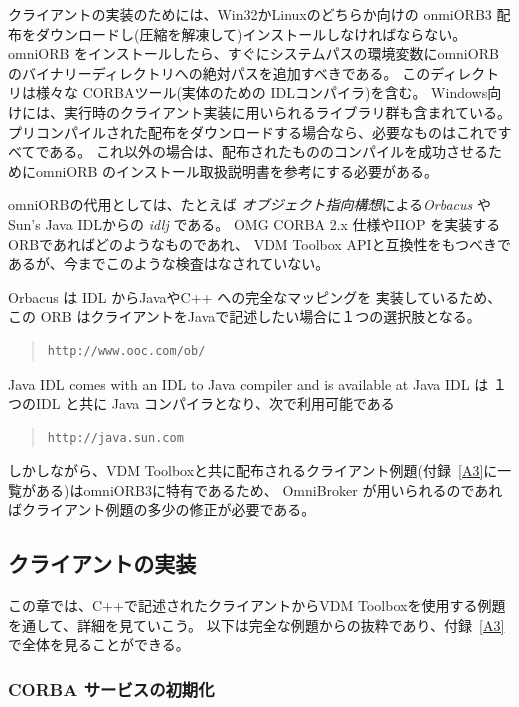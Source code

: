 \documentclass[\pformat,12pt]{jarticle}
\begin{document}
クライアントの実装のためには、Win32かLinuxのどちらか向けの onmiORB3 配布をダウンロードし(圧縮を解凍して)インストールしなければならない。
omniORB をインストールしたら、すぐにシステムパスの環境変数にomniORBのバイナリーディレクトリへの絶対パスを追加すべきである。
このディレクトリは様々な CORBAツール(実体のための IDLコンパイラ)を含む。
Windows向けには、実行時のクライアント実装に用いられるライブラリ群も含まれている。
プリコンパイルされた配布をダウンロードする場合なら、必要なものはこれですべてである。
これ以外の場合は、配布されたもののコンパイルを成功させるためにomniORB のインストール取扱説明書を参考にする必要がある。

omniORBの代用としては、たとえば {\em オブジェクト指向構想}による{\em Orbacus} や Sun's Java IDLからの {\em idlj} である。
 OMG CORBA 2.x 仕様やIIOP を実装するORBであればどのようなものであれ、 VDM Toolbox APIと互換性をもつべきであるが、今までこのような検査はなされていない。

Orbacus は IDL からJavaやC++ への完全なマッピングを 実装しているため、この ORB はクライアントをJavaで記述したい場合に１つの選択肢となる。

\begin{quote}
\begin{verbatim}    
http://www.ooc.com/ob/ 
\end{verbatim}
\end{quote}


Java IDL comes with an IDL to Java compiler and is available
at
Java IDL は １つのIDL と共に Java コンパイラとなり、次で利用可能である

\begin{quote}
\begin{verbatim}    
http://java.sun.com 
\end{verbatim}
\end{quote}

しかしながら、VDM Toolboxと共に配布されるクライアント例題(付録~\ref{A3}に一覧がある)はomniORB3に特有であるため、 OmniBroker が用いられるのであればクライアント例題の多少の修正が必要である。

\subsection{クライアントの実装}

この章では、C++で記述されたクライアントからVDM Toolboxを使用する例題を通して、詳細を見ていこう。
以下は完全な例題からの抜粋であり、付録~\ref{A3}で全体を見ることができる。

\subsubsection{CORBA サービスの初期化}
\end{document}
